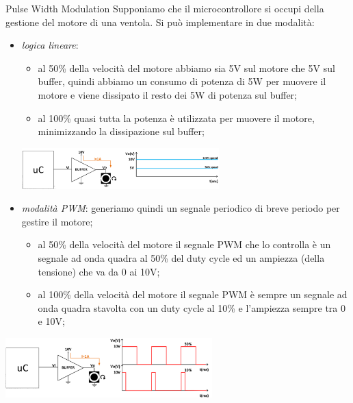 \documentclass[
]{book}
\providecommand{\tightlist}{%
  \setlength{\itemsep}{0pt}\setlength{\parskip}{0pt}}
\begin{document}
\begin{redbox}{Pulse Width Modulation}
Supponiamo che il microcontrollore si occupi della gestione del motore di una ventola. Si può implementare in due modalità:

\begin{itemize}
\tightlist
\item
  \emph{logica lineare}:

  \begin{itemize}
  \tightlist
  \item
    al 50\% della velocità del motore abbiamo sia 5V sul motore che 5V
    sul buffer, quindi abbiamo un consumo di potenza di 5W per muovere
    il motore e viene dissipato il resto dei 5W di potenza sul buffer;
  \item
    al 100\% quasi tutta la potenza è utilizzata per muovere il motore,
    minimizzando la dissipazione sul buffer;
  \end{itemize}

\begin{center}
\begin{minipage}[c]{0.8\linewidth}
\center\includegraphics[width=0.6\textwidth]{assets/imgs/linear_mode.png}
\end{minipage}
\end{center}
    
\item
  \emph{modalità PWM}: generiamo quindi un segnale periodico di breve
  periodo per gestire il motore;

  \begin{itemize}
  \tightlist
  \item
    al 50\% della velocità del motore il segnale PWM che lo controlla è
    un segnale ad onda quadra al 50\% del duty cycle ed un ampiezza
    (della tensione) che va da 0 ai 10V;
  \item
    al 100\% della velocità del motore il segnale PWM è sempre un
    segnale ad onda quadra stavolta con un duty cycle al 10\% e
    l'ampiezza sempre tra 0 e 10V;
  \end{itemize}
\end{itemize}

\begin{center}
\begin{minipage}[c]{0.8\linewidth}
\center\includegraphics[width=0.6\textwidth]{assets/imgs/pwm_mode.png}
\end{minipage}
\end{center}



\end{redbox}
\end{document}
